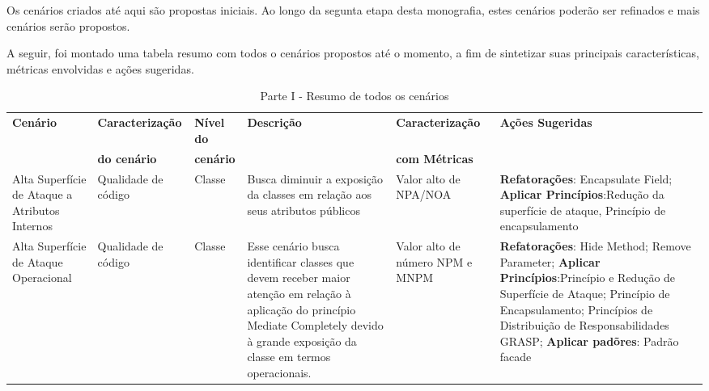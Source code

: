 
Os cenários criados até aqui são propostas iniciais. Ao longo da segunta etapa desta monografia, estes cenários poderão ser refinados e mais cenários serão propostos.

A seguir, foi montado uma tabela resumo com todos o cenários propostos até o momento, a fim de sintetizar suas principais características, métricas envolvidas e ações sugeridas.


\begin{landscape}

	\begin{table}[H]
		\begin{center}
	    \begin{tabular}{ |p{}| p{3cm} | p{2cm} | p{5cm} | p{5cm}  | p{5cm}  |}
	    \hline
	    \textbf{Cenário} & \textbf{Caracterização} & \textbf{Nível do} & \textbf{Descrição} & \textbf{Caracterização} & \textbf{Ações Sugeridas} \\
	      & \textbf{do cenário} & \textbf{cenário} &  & \textbf{com Métricas} & \\ 	\hline
	    Alta Superfície de Ataque a Atributos Internos & Qualidade de código & Classe & Busca diminuir a exposição da classes em relação aos seus atributos públicos & Valor alto de NPA/NOA &  \textbf{Refatorações}: Encapsulate Field; \textbf{Aplicar Princípios}:Redução da superfície de ataque, Princípio de encapsulamento \\ \hline

	    Alta Superfície de Ataque Operacional & Qualidade de código & Classe & Esse cenário busca identificar classes que devem receber maior atenção em relação à aplicação do princípio Mediate Completely devido à grande exposição da classe em termos operacionais.& Valor alto de número NPM e MNPM & \textbf{Refatorações}: Hide Method; Remove Parameter; \textbf{Aplicar Princípios}:Princípio e Redução de Superfície de Ataque;
Princípio de Encapsulamento; Princípios de Distribuição de Responsabilidades GRASP; \textbf{Aplicar padõres}: Padrão facade\\ \hline

	    \end{tabular}
		    \caption{Parte I - Resumo de todos os cenários}
		    \label{tab:resumoI}
		\end{center}
	\end{table}


\end{landscape}
